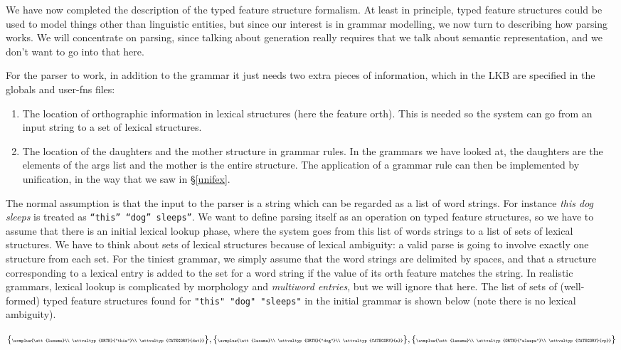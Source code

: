 \documentclass[12pt]{report}
\newcommand{\newterm}[1]{{\it #1}}
\begin{document}
We have now completed the description of the typed feature structure
formalism.  At least in principle, typed feature structures could
be used to model things other than linguistic entities, but since our
interest is in grammar modelling, we now turn to describing
how parsing works.
We will concentrate on parsing, since 
talking about generation really requires that we talk about semantic
representation, and we don't want to go into that here.

For the parser to work, in addition to the grammar
it just needs two extra pieces of
information, which in the LKB are specified in the globals and user-fns files:
\begin{enumerate}
\item The location of orthographic information in lexical structures
(here the feature {\feature orth}).  This is needed so the system can go
from an input string to a set of lexical structures.
\item The location of the daughters and the mother structure in
grammar rules.  In the grammars we have looked at,
the daughters are the elements of the {\feature args} list
and the mother is the entire structure.  The application of
a grammar rule can then be implemented by unification, in the way that
we saw in \S\ref{unifex}. 
\end{enumerate}

The normal assumption is that
the input to the parser is a string which can be regarded
as a list of word strings.  For instance {\it this dog sleeps}
is treated as {\tt ``this'' ``dog'' sleeps''}.
We want to define parsing itself as an 
operation on typed feature structures, so we have to assume that
there is an initial lexical lookup phase, where the system
goes from this list of words strings to a list of sets of lexical
structures.  We have to think about sets of lexical
structures because of lexical
ambiguity: a valid parse is going to involve exactly one structure from
each set.  For the tiniest grammar, we simply assume that the word
strings are delimited by spaces, and that a structure corresponding
to a lexical entry
is added to the set for a word string if the value of its {\feature orth} feature
matches the string.  In realistic grammars, lexical lookup is complicated
by morphology and \newterm{multiword entries}, but we will ignore that here.
The list of sets of
(well-formed) typed feature structures 
found for {\tt "this" "dog" "sleeps"} in 
the initial grammar is shown below (note there is no lexical
ambiguity).
\begin{center}
$
\{
\mbox{\tiny $\avmplus{\att{lexeme}\\              
\attvaltyp{ORTH}{"this"}\\                                      
 \attvaltyp{CATEGORY}{det}}$} \},
\{
\mbox{\tiny $\avmplus{\att{lexeme}\\
\attvaltyp{ORTH}{"dog"}\\   
\attvaltyp{CATEGORY}{n}}$} \},
\{
\mbox{\tiny $\avmplus{\att{lexeme}\\
\attvaltyp{ORTH}{"sleeps"}\\          
\attvaltyp{CATEGORY}{vp}}$} \}
$
\end{center}
\end{document}
